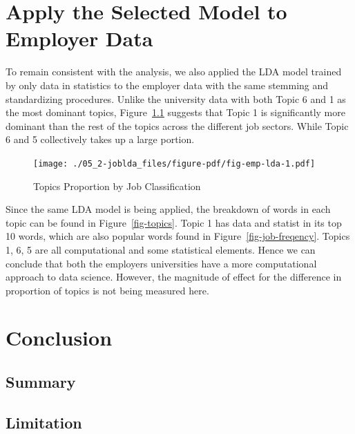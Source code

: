 \documentclass[
  letterpaper,
  DIV=11,
  numbers=noendperiod]{scrreport}
\begin{document}
\hypertarget{apply-the-selected-model-to-employer-data}{%
\chapter{Apply the Selected Model to Employer
Data}\label{apply-the-selected-model-to-employer-data}}

To remain consistent with the analysis, we also applied the LDA model
trained by only data in statistics to the employer data with the same
stemming and standardizing procedures. Unlike the university data with
both Topic 6 and 1 as the most dominant topics, Figure~\ref{fig-emp-lda}
suggests that Topic 1 is significantly more dominant than the rest of
the topics across the different job sectors. While Topic 6 and 5
collectively takes up a large portion.

\begin{figure}

{\centering \texttt{[image: ./05\_2-joblda\_files/figure-pdf/fig-emp-lda-1.pdf]}

}

\caption{\label{fig-emp-lda}Topics Proportion by Job Classification}

\end{figure}

Since the same LDA model is being applied, the breakdown of words in
each topic can be found in Figure~\ref{fig-topics}. Topic 1 has data and
statist in its top 10 words, which are also popular words found in
Figure~\ref{fig-job-freqency}. Topics 1, 6, 5 are all computational and
some statistical elements. Hence we can conclude that both the employers
universities have a more computational approach to data science.
However, the magnitude of effect for the difference in proportion of
topics is not being measured here.


\hypertarget{conclusion}{%
\chapter{Conclusion}\label{conclusion}}

\hypertarget{summary}{%
\section{Summary}\label{summary}}

\hypertarget{limitation}{%
\section{Limitation}\label{limitation}}
\end{document}
